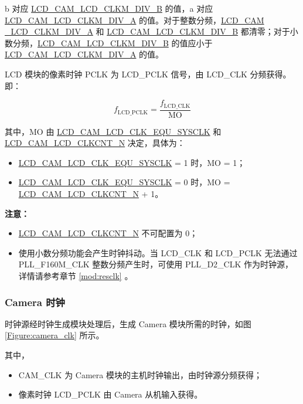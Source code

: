 \documentclass[main\_\_CN.tex]{subfiles}
\begin{document}
b 对应 \hyperref[fielddesc:LCDCAMLCDCLKMDIVB]{LCD\_CAM\_LCD\_CLKM\_DIV\_B} 的值，a 对应 \hyperref[fielddesc:LCDCAMLCDCLKMDIVA]{LCD\_CAM\_LCD\_CLKM\_DIV\_A} 的值。对于整数分频，\hyperref[fielddesc:LCDCAMLCDCLKMDIVA]{LCD\_CAM\\\_LCD\_CLKM\_DIV\_A} 和 \hyperref[fielddesc:LCDCAMLCDCLKMDIVB]{LCD\_CAM\_LCD\_CLKM\_DIV\_B} 都清零；对于小数分频，\hyperref[fielddesc:LCDCAMLCDCLKMDIVB]{LCD\_CAM\_LCD\_CLKM\_DIV\_B} 的值应小于 \hyperref[fielddesc:LCDCAMLCDCLKMDIVA]{LCD\_CAM\_LCD\_CLKM\_DIV\_A} 的值。


LCD 模块的像素时钟 PCLK 为 LCD\_PCLK 信号，由 LCD\_CLK 分频获得。即：

$$f_{\textrm{LCD\_PCLK}} = \frac{f_{\textrm{LCD\_CLK}}}{\textrm{MO}}$$


其中，MO 由 \hyperref[fielddesc:LCDCAMLCDCLKEQUSYSCLK]{LCD\_CAM\_LCD\_CLK\_EQU\_SYSCLK} 和 \hyperref[fielddesc:LCDCAMLCDCLKCNTN]{LCD\_CAM\_LCD\_CLKCNT\_N} 决定，具体为：

\begin{itemize}
    \item \hyperref[fielddesc:LCDCAMLCDCLKEQUSYSCLK]{LCD\_CAM\_LCD\_CLK\_EQU\_SYSCLK} = 1 时，MO = 1；
    \item \hyperref[fielddesc:LCDCAMLCDCLKEQUSYSCLK]{LCD\_CAM\_LCD\_CLK\_EQU\_SYSCLK} = 0 时，MO = \hyperref[fielddesc:LCDCAMLCDCLKCNTN]{LCD\_CAM\_LCD\_CLKCNT\_N} + 1。
\end{itemize}

{\bfseries 注意：}
\begin{itemize}
    \item \hyperref[fielddesc:LCDCAMLCDCLKCNTN]{LCD\_CAM\_LCD\_CLKCNT\_N} 不可配置为 0；
    \item 使用小数分频功能会产生时钟抖动。当 LCD\_CLK 和 LCD\_PCLK 无法通过 PLL\_F160M\_CLK 整数分频产生时，可使用 PLL\_D2\_CLK 作为时钟源，详情请参考章节 \ref{mod:resclk} \textit{}。
\end{itemize}

\subsubsection{Camera 时钟}

时钟源经时钟生成模块处理后，生成 Camera 模块所需的时钟，如图 \ref{Figure:camera_clk} 所示。

其中，
\begin{itemize}
    \item CAM\_CLK 为 Camera 模块的主机时钟输出，由时钟源分频获得；
    \item 像素时钟 LCD\_PCLK 由 Camera 从机输入获得。
\end{itemize}
\end{document}
